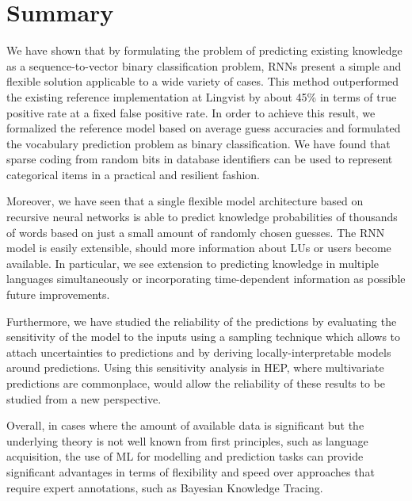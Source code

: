\section{Summary}
We have shown that by formulating the problem of predicting existing knowledge as a sequence-to-vector binary classification problem, RNNs present a simple and flexible solution applicable to a wide variety of cases. This method outperformed the existing reference implementation at Lingvist by about 45\% in terms of true positive rate at a fixed false positive rate. In order to achieve this result, we formalized the reference model based on average guess accuracies and formulated the vocabulary prediction problem as binary classification. We have found that sparse coding from random bits in database identifiers can be used to represent categorical items in a practical and resilient fashion.

Moreover, we have seen that a single flexible model architecture based on recursive neural networks is able to predict knowledge probabilities of thousands of words based on just a small amount of randomly chosen guesses. The RNN model is easily extensible, should more information about LUs or users become available. In particular, we see extension to predicting knowledge in multiple languages simultaneously or incorporating time-dependent information as possible future improvements.

Furthermore, we have studied the reliability of the predictions by evaluating the sensitivity of the model to the inputs using a sampling technique which allows to attach uncertainties to predictions and by deriving locally-interpretable models around predictions. Using this sensitivity analysis in HEP, where multivariate predictions are commonplace, would allow the reliability of these results to be studied from a new perspective.

Overall, in cases where the amount of available data is significant but the underlying theory is not well known from first principles, such as language acquisition, the use of ML for modelling and prediction tasks can provide significant advantages in terms of flexibility and speed over approaches that require expert annotations, such as Bayesian Knowledge Tracing.
